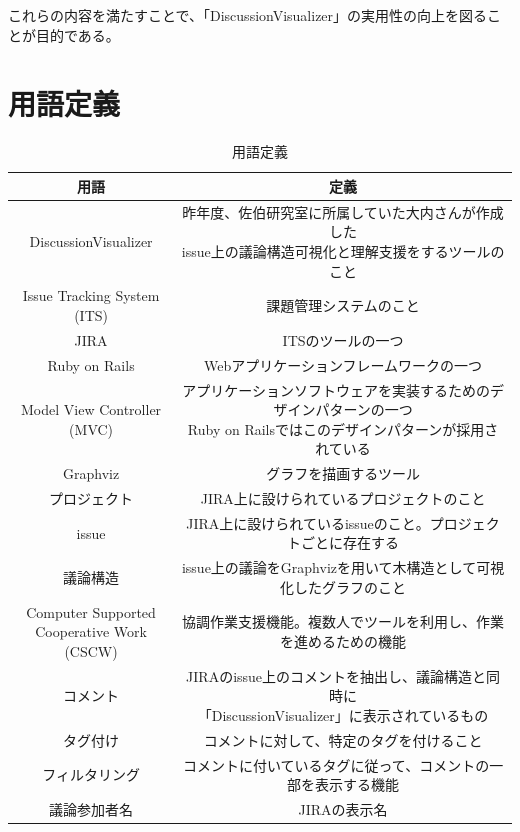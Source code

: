 \documentclass[12pt, oneside]{jreport}
\begin{document}
	これらの内容を満たすことで、「DiscussionVisualizer」の実用性の向上を図ることが目的である。

	\newpage
	
	\section{用語定義}
	\begin{table}[htb]
		\begin{center}
		\caption{用語定義}
		\small
  		\begin{tabular}{|c|c|} \hline
    		用語 & 定義 \\ \hline \hline
    		DiscussionVisualizer & \shortstack{昨年度、佐伯研究室に所属していた大内さんが作成した\\issue上の議論構造可視化と理解支援をするツールのこと}  \\ \hline
		Issue Tracking System (ITS) & 課題管理システムのこと \\ \hline
		JIRA & ITSのツールの一つ \\ \hline
		Ruby on Rails & Webアプリケーションフレームワークの一つ \\ \hline
		\shortstack{Model View Controller \\(MVC)} & \shortstack{アプリケーションソフトウェアを実装するためのデザインパターンの一つ\\ Ruby on Railsではこのデザインパターンが採用されている} \\ \hline
		Graphviz & グラフを描画するツール \\ \hline
		プロジェクト & JIRA上に設けられているプロジェクトのこと  \\ \hline
		issue & JIRA上に設けられているissueのこと。プロジェクトごとに存在する  \\ \hline
    		議論構造 & issue上の議論をGraphvizを用いて木構造として可視化したグラフのこと  \\ \hline
    		\shortstack{Computer Supported \\ Cooperative Work (CSCW)} & 協調作業支援機能。複数人でツールを利用し、作業を進めるための機能  \\ \hline
    		コメント & \shortstack{JIRAのissue上のコメントを抽出し、議論構造と同時に\\「DiscussionVisualizer」に表示されているもの}  \\ \hline
		タグ付け & コメントに対して、特定のタグを付けること  \\ \hline
		フィルタリング & コメントに付いているタグに従って、コメントの一部を表示する機能  \\ \hline
    		議論参加者名 & JIRAの表示名  \\ \hline
  		\end{tabular}
		\normalsize
  		\end{center}
	\end{table}	
	
\end{document}
